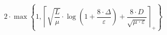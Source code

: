 \[2 \cdot \max\left\{ 1, \left\lceil \sqrt{\frac{L}{\mu}} \cdot \log\left(1 + \frac{8 \cdot \Delta}{\varepsilon}\right) + \frac{8 \cdot D}{\sqrt{\mu \cdot \varepsilon}} \right\rceil_{+} \right\}\]
